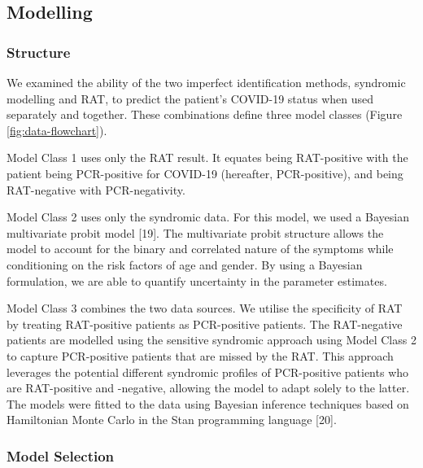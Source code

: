 \documentclass[]{elsarticle} %
\begin{document}
\hypertarget{modelling}{%
\subsection{Modelling}\label{modelling}}

\hypertarget{structure}{%
\subsubsection{Structure}\label{structure}}

We examined the ability of the two imperfect identification methods, syndromic modelling and RAT, to predict the patient's COVID-19 status when used separately and together.
These combinations define three model classes (Figure \ref{fig:data-flowchart}).

Model Class 1 uses only the RAT result.
It equates being RAT-positive with the patient being PCR-positive for COVID-19 (hereafter, PCR-positive), and being RAT-negative with PCR-negativity.

Model Class 2 uses only the syndromic data.
For this model, we used a Bayesian multivariate probit model {[}19{]}.
The multivariate probit structure allows the model to account for the binary and correlated nature of the symptoms while conditioning on the risk factors of age and gender.
By using a Bayesian formulation, we are able to quantify uncertainty in the parameter estimates.

Model Class 3 combines the two data sources.
We utilise the specificity of RAT by treating RAT-positive patients as PCR-positive patients.
The RAT-negative patients are modelled using the sensitive syndromic approach using Model Class 2 to capture PCR-positive patients that are missed by the RAT.
This approach leverages the potential different syndromic profiles of PCR-positive patients who are RAT-positive and -negative, allowing the model to adapt solely to the latter.
The models were fitted to the data using Bayesian inference techniques based on Hamiltonian Monte Carlo in the Stan programming language {[}20{]}.

\hypertarget{model-selection}{%
\subsubsection{Model Selection}\label{model-selection}}
\end{document}
